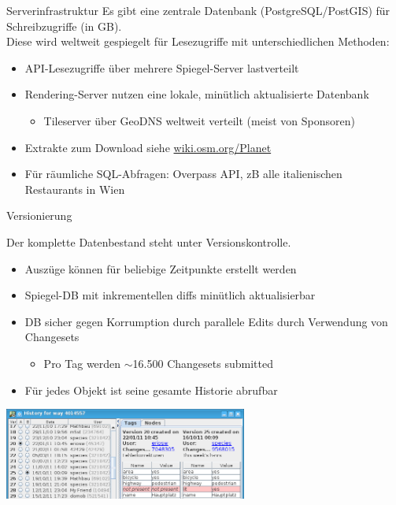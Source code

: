 \documentclass{beamer}
\begin{document}
\begin{frame}{Serverinfrastruktur}
Es gibt eine zentrale Datenbank (PostgreSQL/PostGIS) für Schreibzugriffe (in GB).\\
\pause
Diese wird weltweit gespiegelt für Lesezugriffe mit unterschiedlichen Methoden:

\begin{itemize}
  \item API-Lesezugriffe über mehrere Spiegel-Server lastverteilt
  \item Rendering-Server nutzen eine lokale, minütlich aktualisierte Datenbank
  \begin{itemize}
    \item Tileserver über GeoDNS weltweit verteilt (meist von Sponsoren)
  \end{itemize}
  \item Extrakte zum Download siehe \href{http://wiki.osm.org/Planet}{wiki.osm.org/Planet}
  \item Für räumliche SQL-Abfragen: Overpass API, zB alle italienischen Restaurants in Wien
\end{itemize}

\end{frame}


\begin{frame}{Versionierung}

Der komplette Datenbestand steht unter Versionskontrolle.
\begin{itemize}
  \item Auszüge können für beliebige Zeitpunkte erstellt werden
  \item Spiegel-DB mit inkrementellen diffs minütlich aktualisierbar
  \item DB sicher gegen Korrumption durch parallele Edits durch Verwendung von Changesets
  \begin{itemize}
    \item Pro Tag werden $\sim$16.500 Changesets submitted
  \end{itemize}
  \item Für jedes Objekt ist seine gesamte Historie abrufbar
\end{itemize}

 \hfill \includegraphics[width=8cm]{history.png}


\end{frame}
\end{document}
